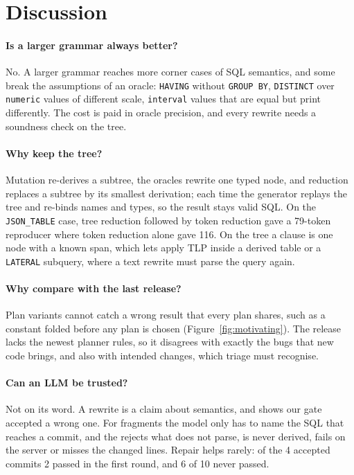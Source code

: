 \section{Discussion}
\label{sec:discussion}

\paragraph{Is a larger grammar always better?} No. A larger grammar reaches
more corner cases of SQL semantics, and some break the assumptions of an
oracle: \texttt{HAVING} without \texttt{GROUP BY}, \texttt{DISTINCT} over
\texttt{numeric} values of different scale, \texttt{interval} values that are
equal but print differently. The cost is paid in oracle precision, and every
rewrite needs a soundness check on the tree.

\paragraph{Why keep the tree?} Mutation re-derives a subtree, the oracles
rewrite one typed node, and reduction replaces a subtree by its smallest
derivation; each time the generator replays the tree and re-binds names and
types, so the result stays valid SQL. On the \texttt{JSON\_TABLE} case, tree
reduction followed by token reduction gave a 79-token reproducer where token
reduction alone gave 116. On the tree a clause is one node with a known span,
which lets \tool apply TLP inside a derived table or a \texttt{LATERAL}
subquery, where a text rewrite must parse the query again.

\paragraph{Why compare with the last release?} Plan variants cannot catch a
wrong result that every plan shares, such as a constant folded before any plan
is chosen (Figure~\ref{fig:motivating}). The release lacks the newest planner
rules, so it disagrees with exactly the bugs that new code brings, and also with
intended changes, which triage must recognise.

\paragraph{Can an LLM be trusted?} Not on its word. A rewrite is a claim about
semantics, and  shows our gate accepted a wrong one. For fragments the
model only has to name the SQL that reaches a commit, and the \gate rejects what
does not parse, is never derived, fails on the server or misses the changed
lines. Repair helps rarely: of the 4 accepted commits 2 passed in the first
round, and 6 of 10 never passed.

